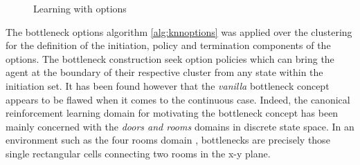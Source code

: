 \begin{figure}
\centering
{}\hspace{2mm}%
\caption{Learning with options}
\end{figure}

The bottleneck options algorithm \ref{alg:knnoptions} was applied over the clustering for the definition of the initiation, policy and termination components of the options. The bottleneck construction seek option policies which can bring the agent at the boundary of their respective cluster from any state within the initiation set. It has been found however that the \textit{vanilla} bottleneck concept appears to be flawed when it comes to the continuous case. Indeed, the canonical reinforcement learning domain for motivating the bottleneck concept has been mainly concerned with the \textit{doors and rooms} domains in discrete state space. In an environment such as the four rooms domain \cite{Sutton1999}, bottlenecks are precisely those single rectangular cells connecting two rooms in the x-y plane. 

